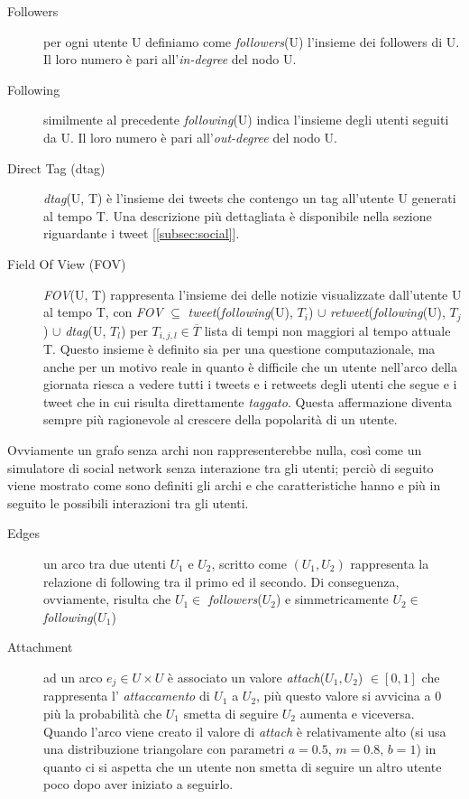 \documentclass[a4paper,12pt]{article}
\begin{document}
\begin{description}
  \item[Followers] per ogni utente U definiamo come \textit{followers}(U) 
  l'insieme dei followers di U. Il loro numero è pari all'\textit{in-degree} del nodo U.
  \item[Following] similmente al precedente \textit{following}(U) indica
  l'insieme degli utenti seguiti da U. Il loro numero è pari all'\textit{out-degree} del nodo U.
  \item[Direct Tag (dtag)] \textit{dtag}(U, T) \`e l'insieme dei tweets che
  contengo un tag all'utente U generati al tempo T. 
  Una descrizione pi\`u dettagliata \`e disponibile nella sezione
  riguardante i tweet [\ref{subsec:social}].
  \item[Field Of View (FOV)] \textit{FOV}(U, T) rappresenta l'insieme dei
  delle notizie visualizzate dall'utente U al tempo T, con 
  \textit{FOV} $\subseteq$ \textit{tweet}(\textit{following}(U), $T_i$) $\cup$ 
  \textit{retweet}(\textit{following}(U), $T_j$) $\cup$ \textit{dtag}(U, $T_l$) 
  per $T_{i,j,l} \in \overline{T}$ lista di
  tempi non maggiori al tempo attuale T.
  Questo insieme \`e definito sia per una questione
  computazionale, ma anche per un motivo reale in quanto \`e 
  difficile che un utente nell'arco della giornata riesca a vedere
  tutti i tweets e i retweets degli utenti che segue e i tweet che
  in cui risulta direttamente \textit{taggato}. Questa affermazione
  diventa sempre pi\`u ragionevole al crescere della popolarit\`a 
  di un utente.
\end{description}

Ovviamente un grafo senza archi non rappresenterebbe nulla, cos\`i come un simulatore di social network senza interazione tra gli utenti; perci\`o di seguito viene mostrato come sono definiti gli archi e che caratteristiche hanno e pi\`u in seguito le possibili interazioni tra gli utenti.

\begin{description}
  \item[Edges] un arco tra due utenti $U_1$ e $U_2$, scritto come
  $(U_1 ,U_2)$ rappresenta la relazione di following tra il primo 
  ed il secondo. Di conseguenza, ovviamente, 
  risulta che $U_1 \in $  \textit{followers}($U_2$) e simmetricamente
   $U_2 \in $  \textit{following}($U_1$)
   \item[Attachment] ad un arco $e_j \in U\times U$ \`e associato un 
   valore \textit{attach}($U_1, U_2$) $ \in [0,1]$ che rappresenta l' 
   \textit{attaccamento} di $U_1$ a $U_2$, pi\`u questo valore si 
   avvicina a 0 pi\`u la probabilit\`a che $U_1$ smetta di seguire
   $U_2$ aumenta e viceversa. Quando l'arco viene creato il valore
   di \textit{attach} \`e relativamente alto (si usa una distribuzione triangolare con parametri $a = 0.5$, $m = 0.8$, $b = 1$) in quanto ci si 
   aspetta che un utente non smetta di seguire un altro utente
   poco dopo aver iniziato a seguirlo.
\end{description}
\end{document}
